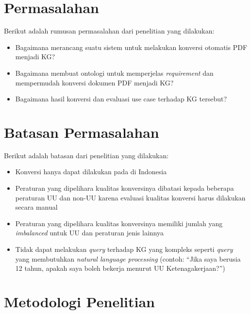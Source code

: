 \section{Permasalahan}
\label{sec:permasalahan}

Berikut adalah rumusan permasalahan dari penelitian yang dilakukan:
\begin{itemize}
  \item Bagaimana merancang suatu sistem untuk melakukan konversi otomatis PDF \legal menjadi KG?
  \item Bagaimana membuat ontologi untuk memperjelas \textit{requirement} dan mempermudah konversi
        dokumen PDF menjadi KG?
  \item Bagaimana hasil konversi dan evaluasi use case terhadap KG \legal tersebut?
\end{itemize}

\section{Batasan Permasalahan}
\label{sec:batasan-permasalahan}

Berikut adalah batasan dari penelitian yang dilakukan:
\begin{itemize}
  \item Konversi hanya dapat dilakukan pada \legal di Indonesia
  \item Peraturan yang dipelihara kualitas konversinya dibatasi kepada beberapa peraturan UU dan
        non-UU karena evaluasi kualitas konversi harus dilakukan secara manual
  \item Peraturan yang dipelihara kualitas konversinya memiliki jumlah yang \textit{imbalanced}
        untuk UU dan peraturan jenis lainnya
  \item Tidak dapat melakukan \textit{query} terhadap KG yang kompleks seperti \textit{query} yang
        membutuhkan \textit{natural language processing} (contoh: ``Jika saya berusia 12 tahun, apakah
        saya boleh bekerja menurut UU Ketenagakerjaan?'')
\end{itemize}

\section{Metodologi Penelitian}
\label{sec:metodologi-penelitian}

